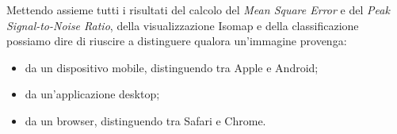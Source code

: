 

\vspace{1em}

Mettendo assieme tutti i risultati del calcolo del \textit{Mean Square Error} e del \textit{Peak Signal-to-Noise Ratio}, della visualizzazione Isomap e della classificazione possiamo dire di riuscire a distinguere qualora un'immagine provenga:

\begin{itemize}
    \item da un dispositivo mobile, distinguendo tra Apple e Android;
    \item da un'applicazione desktop;
    \item da un browser, distinguendo tra Safari e Chrome.
\end{itemize}


